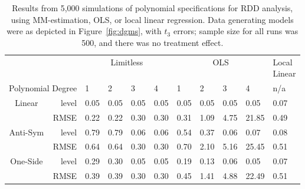 
        \begin{table}[ht]
\centering
\begin{tabular}{cr|llll|llll|l }
  \hline
&& \multicolumn{4}{c|}{Limitless} &  \multicolumn{4}{c|}{OLS} &\makecell[c]{Local\\Linear}  \\
 \multicolumn{2}{r|}{Polynomial Degree}&1&2&3&4&1&2&3&4& n/a  \\
\hline
\hline
\multirow{ 2 }{*}{ Linear }& level &0.05&0.05&0.05&0.05&0.05&0.05&0.05&0.05&0.07\\
& RMSE &0.22&0.22&0.30&0.30&0.31&1.09&4.75&21.85&0.49\\
\hline
\hline
\multirow{ 2 }{*}{ Anti-Sym }& level &0.79&0.79&0.06&0.06&0.54&0.37&0.06&0.07&0.08\\
& RMSE &0.64&0.64&0.30&0.30&0.70&2.10&5.16&25.45&0.51\\
\hline
\hline
\multirow{ 2 }{*}{ One-Side }& level &0.29&0.30&0.05&0.05&0.19&0.13&0.06&0.05&0.07\\
& RMSE &0.39&0.39&0.30&0.30&0.45&1.41&4.88&22.49&0.51\\

 \hline
\end{tabular}
\caption{Results from 5,000 simulations
of polynomial specifications for RDD analysis, using
MM-estimation, OLS, or
local linear regression. Data generating models were
as depicted in Figure~\ref{fig:dgms}, with $t_{3}$ errors;
sample size for all runs was 500, and there was no
treatment effect.}
\label{tab:poly}
\end{table}
